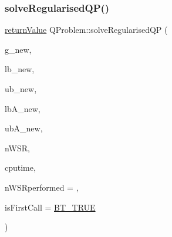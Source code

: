 \subsubsection{\texorpdfstring{solve\+Regularised\+Q\+P()}{solveRegularisedQP()}}
{\footnotesize\ttfamily \hyperlink{_message_handling_8hpp_a81d556f613bfbabd0b1f9488c0fa865e}{return\+Value} Q\+Problem\+::solve\+Regularised\+QP (\begin{DoxyParamCaption}\item[{const \hyperlink{qp_o_a_s_e_s__wrapper_8h_a0d00e2b3dfadee81331bbb39068570c4}{real\+\_\+t} $\ast$const}]{g\+\_\+new,  }\item[{const \hyperlink{qp_o_a_s_e_s__wrapper_8h_a0d00e2b3dfadee81331bbb39068570c4}{real\+\_\+t} $\ast$const}]{lb\+\_\+new,  }\item[{const \hyperlink{qp_o_a_s_e_s__wrapper_8h_a0d00e2b3dfadee81331bbb39068570c4}{real\+\_\+t} $\ast$const}]{ub\+\_\+new,  }\item[{const \hyperlink{qp_o_a_s_e_s__wrapper_8h_a0d00e2b3dfadee81331bbb39068570c4}{real\+\_\+t} $\ast$const}]{lb\+A\+\_\+new,  }\item[{const \hyperlink{qp_o_a_s_e_s__wrapper_8h_a0d00e2b3dfadee81331bbb39068570c4}{real\+\_\+t} $\ast$const}]{ub\+A\+\_\+new,  }\item[{\hyperlink{_types_8hpp_ab6fd6105e64ed14a0c9281326f05e623}{int\+\_\+t} \&}]{n\+W\+SR,  }\item[{\hyperlink{qp_o_a_s_e_s__wrapper_8h_a0d00e2b3dfadee81331bbb39068570c4}{real\+\_\+t} $\ast$const}]{cputime,  }\item[{\hyperlink{_types_8hpp_ab6fd6105e64ed14a0c9281326f05e623}{int\+\_\+t}}]{n\+W\+S\+Rperformed = {},  }\item[{\hyperlink{_types_8hpp_a20f82124c82b6f5686a7fce454ef9089}{Boolean\+Type}}]{is\+First\+Call = {\ttfamily \hyperlink{_types_8hpp_a20f82124c82b6f5686a7fce454ef9089a34c57965bfb07125b09326a69019f9c6}{B\+T\+\_\+\+T\+R\+UE}} }\end{DoxyParamCaption})\hspace{0.3cm}{\ttfamily [protected]}}


